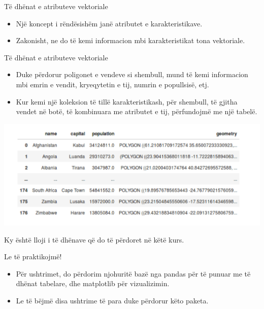 \documentclass[
  ignorenonframetext,
]{beamer}
\begin{document}
\begin{frame}{Të dhënat e atributeve vektoriale}
\protect\hypertarget{tuxeb-dhuxebnat-e-atributeve-vektoriale}{}
\begin{itemize}
\item
  Një koncept i rëndësishëm janë atributet e karakteristikave.
\item
  Zakonisht, ne do të kemi informacion mbi karakteristikat tona
  vektoriale.
\end{itemize}
\end{frame}

\begin{frame}{Të dhënat e atributeve vektoriale}
\protect\hypertarget{tuxeb-dhuxebnat-e-atributeve-vektoriale-1}{}
\begin{itemize}
\item
  Duke përdorur poligonet e vendeve si shembull, mund të kemi
  informacion mbi emrin e vendit, kryeqytetin e tij, numrin e
  popullsisë, etj.
\item
  Kur kemi një koleksion të tillë karakteristikash, për shembull, të
  gjitha vendet në botë, të kombinuara me atributet e tij, përfundojmë
  me një tabelë.
\end{itemize}

\includegraphics{./Figs/geotable.png}

Ky është lloji i të dhënave që do të përdoret në këtë kurs.
\end{frame}

\begin{frame}{Le të praktikojmë!}
\protect\hypertarget{le-tuxeb-praktikojmuxeb}{}
\begin{itemize}
\item
  Për ushtrimet, do përdorim njohuritë bazë nga pandas për të punuar me
  të dhënat tabelare, dhe matplotlib për vizualizimin.
\item
  Le të bëjmë disa ushtrime të para duke përdorur këto paketa.
\end{itemize}
\end{frame}
\end{document}
